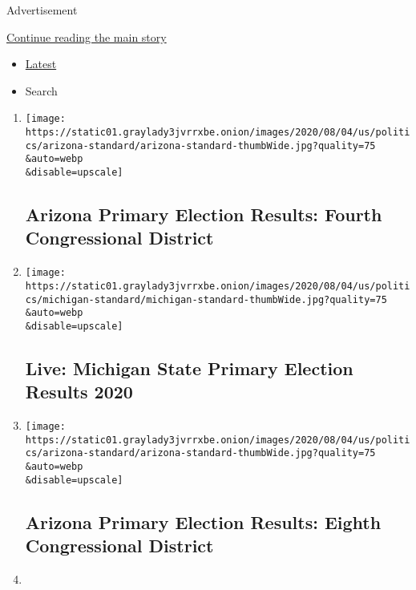 Advertisement

\protect\hyperlink{after-mid1}{Continue reading the main story}

\begin{itemize}
\tightlist
\item
  \protect\hyperlink{stream-panel}{Latest}
\item
  Search
\end{itemize}

\begin{enumerate}
\def\labelenumi{\arabic{enumi}.}
\item
  \href{/interactive/2020/08/04/us/elections/results-arizona-house-district-4-primary-election.html}{}

  \texttt{[image: https://static01.graylady3jvrrxbe.onion/images/2020/08/04/us/politics/arizona-standard/arizona-standard-thumbWide.jpg?quality=75\\\&auto=webp\\\&disable=upscale]}

  \hypertarget{arizona-primary-election-results-fourth-congressional-district}{%
  \subsection{Arizona Primary Election Results: Fourth Congressional
  District}\label{arizona-primary-election-results-fourth-congressional-district}}
\item
  \href{/interactive/2020/08/04/us/elections/results-michigan-primary-elections.html}{}

  \texttt{[image: https://static01.graylady3jvrrxbe.onion/images/2020/08/04/us/politics/michigan-standard/michigan-standard-thumbWide.jpg?quality=75\\\&auto=webp\\\&disable=upscale]}

  \hypertarget{live-michigan-state-primary-election-results-2020}{%
  \subsection{Live: Michigan State Primary Election Results
  2020}\label{live-michigan-state-primary-election-results-2020}}
\item
  \href{/interactive/2020/08/04/us/elections/results-arizona-house-district-8-primary-election.html}{}

  \texttt{[image: https://static01.graylady3jvrrxbe.onion/images/2020/08/04/us/politics/arizona-standard/arizona-standard-thumbWide.jpg?quality=75\\\&auto=webp\\\&disable=upscale]}

  \hypertarget{arizona-primary-election-results-eighth-congressional-district}{%
  \subsection{Arizona Primary Election Results: Eighth Congressional
  District}\label{arizona-primary-election-results-eighth-congressional-district}}
\item
  \href{/interactive/2020/08/04/us/elections/results-michigan-house-district-10-primary-election.html}{}


\end{enumerate}
